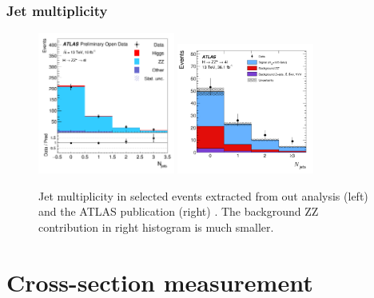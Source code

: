 \documentclass[aspectratio=1610, english]{beamer}
\begin{document}
\begin{frame}
\frametitle{Jet multiplicity}

\begin{figure} [H]
\centering
\includegraphics[width=0.4\textwidth]{hist_n_jets.png}
\includegraphics[width=0.4\textwidth]{hist_n_jets_pub.png}
\caption{ Jet multiplicity in selected events extracted from out analysis (left) and the ATLAS publication (right) \cite{hzz}. The background ZZ contribution in right histogram is much smaller.}
\end{figure}

\end{frame}


\section{Cross-section measurement}
\end{document}
